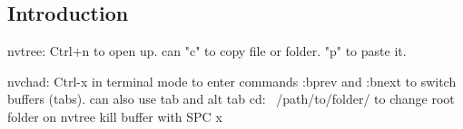 
\subsection{Introduction}

nvtree: Ctrl+n to open up. can "c" to copy file or folder. "p" to paste it.


nvchad:
Ctrl-x in terminal mode to enter commands
:bprev and :bnext to switch buffers (tabs). can also use tab and alt tab
cd: ~/path/to/folder/ to change root folder on nvtree
kill buffer with SPC x
